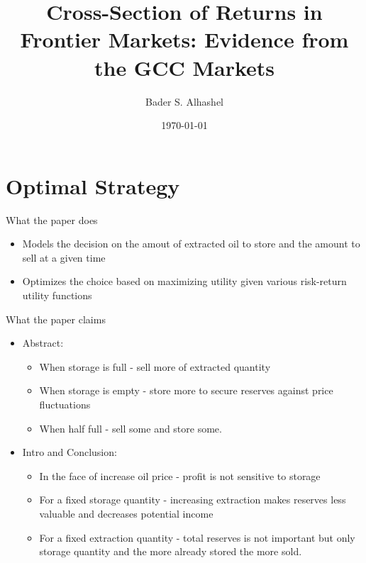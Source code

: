 \documentclass[xcolor=table]{beamer}
\begin{document}
\title[GCC Markets]{\textbf{Cross-Section of Returns in Frontier Markets:
		Evidence from the GCC Markets}}
\vspace{-24pt}
\author[J. Poland]{{Bader S. Alhashel}}
\date{\today}

\begin{frame}
\titlepage
\end{frame}

\section{Optimal Strategy}
\begin{frame}{What the paper does}
   \begin{itemize}[<+->]
   	\item Models the decision on the amout of extracted oil to store and the amount to sell at a given time
   	\item Optimizes the choice based on maximizing utility given various risk-return utility functions
   \end{itemize}
\end{frame}

\begin{frame}{What the paper claims}
 \begin{itemize}[<+->]
 	\item Abstract:
 	\begin{itemize}[<+->]
 		\item When storage is full - sell more of extracted quantity
 		\item When storage is empty - store more to secure reserves against price fluctuations
 		\item When half full - sell some and store some.
 	\end{itemize}
 	\item Intro and Conclusion:
 	\begin{itemize}[<+->]
 		\item In the face of increase oil price - profit is not sensitive to storage
 		\item For a fixed storage quantity - increasing extraction makes reserves less valuable and decreases potential income
 		\item For a fixed extraction quantity - total reserves is not important but only storage quantity and the more already stored the more sold.
 	\end{itemize}
 \end{itemize}
\end{frame}
\end{document}
